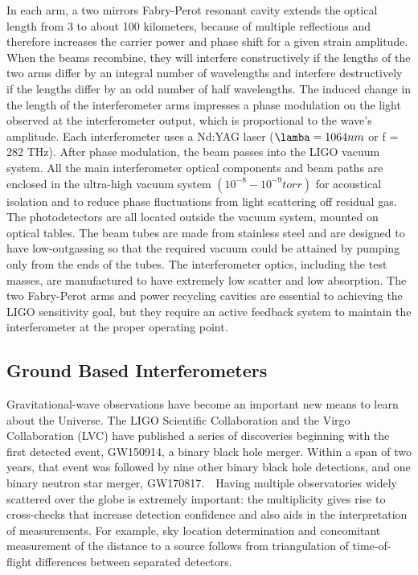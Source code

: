 \documentclass[binding=0.6cm, LaM]{sapthesis}
\begin{document}
	In each arm, a two mirrors Fabry-Perot resonant cavity extends the optical length from 3 to about 100 kilometers, 
	because of multiple reflections and therefore increases the carrier power and phase shift for a given strain amplitude. 
	When the beams recombine, they will interfere constructively if the lengths of the two arms differ by an integral number 
	of wavelengths and interfere destructively if the lengths differ by an odd number of half wavelengths.
	The induced change in the length of the interferometer arms impresses a phase modulation on the 
	light observed at the interferometer output, which is proportional to the wave’s amplitude.
	Each interferometer uses a Nd:YAG laser  ($\lamba = 1064 nm$ or f = 282 THz).
	After phase modulation, the beam passes into the LIGO vacuum system. 
	All the main interferometer optical components and beam paths are enclosed in the ultra-high vacuum system 
	$(10^{−8} - 10^{−9} torr)$ for acoustical isolation and to reduce phase fluctuations from light scattering off residual gas. 
	The photodetectors are all located outside the vacuum system, mounted on optical tables. 
	The beam tubes are made from stainless steel and are designed to have low-outgassing 
	so that the required vacuum could be attained by pumping only from the ends of the tubes. 
	The interferometer optics, including the test masses, are manufactured to have extremely low scatter and low absorption.
	The two Fabry-Perot arms and power recycling cavities are essential to achieving the LIGO sensitivity goal, 
	but they require an active feedback system to maintain the interferometer at the proper operating point.


\subsection{Ground Based Interferometers}

	Gravitational-wave observations have become an important new means to learn about the Universe. 
	The LIGO Scientific Collaboration and the Virgo Collaboration (LVC) have published a series 
	of discoveries beginning with the first detected event, GW150914, a binary black hole merger. 
	Within a span of two years, that event was followed by nine other binary black hole detections, 
	and one binary neutron star merger, GW170817.  
	Having multiple observatories widely scattered over the globe is extremely important: 
	the multiplicity gives rise to cross-checks that increase detection confidence and also 
	aids in the interpretation of measurements. 
	For example, sky location determination and concomitant measurement of the distance 
	to a source follows from triangulation of time-of-flight differences between separated detectors.
\end{document}
